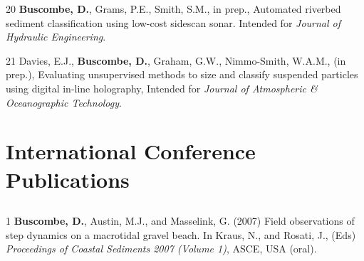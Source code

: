 \documentclass[margin,line]{resume}
\begin{document}
\begin{resume}
\begin{footnotesize}
\begin{list1}
	\item[20] {\bf Buscombe, D.}, Grams, P.E., Smith, S.M., in prep., Automated riverbed sediment classification using low-cost sidescan sonar. Intended for {\sl Journal of Hydraulic Engineering}.\\

	\item[21] Davies, E.J., {\bf Buscombe, D.}, Graham, G.W., Nimmo-Smith, W.A.M., (in prep.), Evaluating unsupervised methods to size and classify suspended particles using digital in-line holography, Intended for {\sl Journal of Atmospheric \& Oceanographic Technology}. 




	\end{list1}
        
        \end{footnotesize}

    \section{\mysidestyle International Conference Publications}

	\subsection{}
        \begin{footnotesize}
	\begin{list1}
	\item[1] {\bf Buscombe, D.}, Austin, M.J., and Masselink, G. (2007) Field observations of step dynamics on a macrotidal gravel beach. In Kraus, N., and Rosati, J., (Eds) {\sl Proceedings of Coastal Sediments 2007 (Volume 1)}, ASCE, USA (oral).\\
	

\end{list1}
\end{footnotesize}
\end{resume}
\end{document}
